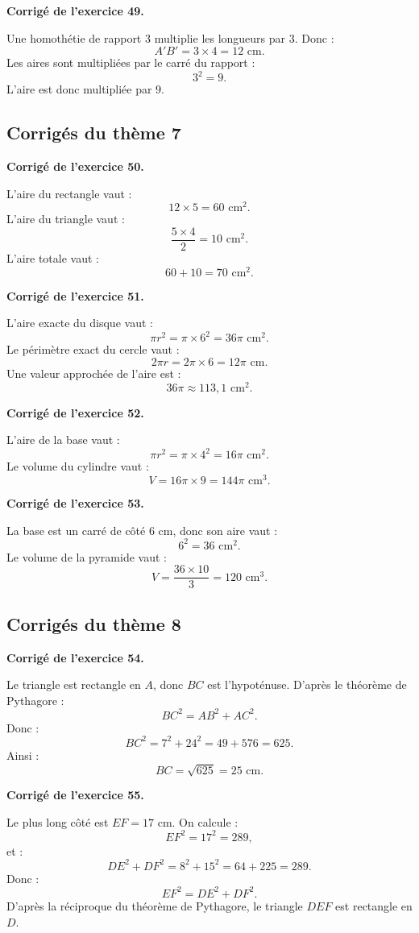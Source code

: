 \documentclass[11pt,a4paper]{article}
\newcounter{exercice}
\newenvironment{corrige}[1][]
{\par\medskip\noindent\textbf{Corrigé de l'exercice #1.}\par\smallskip}
{\medskip}
\begin{document}
\begin{corrige}[49]
Une homothétie de rapport $3$ multiplie les longueurs par $3$. Donc :
\[
A'B'=3\times4=12\text{ cm}.
\]
Les aires sont multipliées par le carré du rapport :
\[
3^2=9.
\]
L'aire est donc multipliée par $9$.
\end{corrige}

\subsection*{Corrigés du thème 7}

\begin{corrige}[50]
L'aire du rectangle vaut :
\[
12\times5=60\text{ cm}^2.
\]
L'aire du triangle vaut :
\[
\frac{5\times4}{2}=10\text{ cm}^2.
\]
L'aire totale vaut :
\[
60+10=70\text{ cm}^2.
\]
\end{corrige}

\begin{corrige}[51]
L'aire exacte du disque vaut :
\[
\pi r^2=\pi\times6^2=36\pi\text{ cm}^2.
\]
Le périmètre exact du cercle vaut :
\[
2\pi r=2\pi\times6=12\pi\text{ cm}.
\]
Une valeur approchée de l'aire est :
\[
36\pi\approx113,1\text{ cm}^2.
\]
\end{corrige}

\begin{corrige}[52]
L'aire de la base vaut :
\[
\pi r^2=\pi\times4^2=16\pi\text{ cm}^2.
\]
Le volume du cylindre vaut :
\[
V=16\pi\times9=144\pi\text{ cm}^3.
\]
\end{corrige}

\begin{corrige}[53]
La base est un carré de côté $6$ cm, donc son aire vaut :
\[
6^2=36\text{ cm}^2.
\]
Le volume de la pyramide vaut :
\[
V=\frac{36\times10}{3}=120\text{ cm}^3.
\]
\end{corrige}

\subsection*{Corrigés du thème 8}

\begin{corrige}[54]
Le triangle est rectangle en $A$, donc $BC$ est l'hypoténuse. D'après le théorème de Pythagore :
\[
BC^2=AB^2+AC^2.
\]
Donc :
\[
BC^2=7^2+24^2=49+576=625.
\]
Ainsi :
\[
BC=\sqrt{625}=25\text{ cm}.
\]
\end{corrige}

\begin{corrige}[55]
Le plus long côté est $EF=17$ cm. On calcule :
\[
EF^2=17^2=289,
\]
et :
\[
DE^2+DF^2=8^2+15^2=64+225=289.
\]
Donc :
\[
EF^2=DE^2+DF^2.
\]
D'après la réciproque du théorème de Pythagore, le triangle $DEF$ est rectangle en $D$.
\end{corrige}
\end{document}
